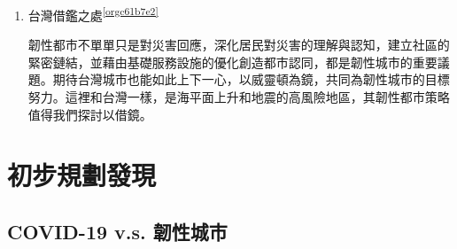 \documentclass[a4paper,12pt]{article}
\begin{document}
\begin{enumerate}
\begin{enumerate}
\item 台灣借鑑之處\textsuperscript{\ref{orgc61b7e2}}
\label{sec:org38142f9}

韌性都市不單單只是對災害回應，深化居民對災害的理解與認知，建立社區的緊密鏈結，並藉由基礎服務設施的優化創造都市認同，都是韌性城市的重要議題。期待台灣城市也能如此上下一心，以威靈頓為鏡，共同為韌性城市的目標努力。這裡和台灣一樣，是海平面上升和地震的高風險地區，其韌性都市策略值得我們探討以借鏡。\\
\newpage
\end{enumerate}
\end{enumerate}

\section{初步規劃發現}
\label{sec:orgf45dd0e}

\subsection{COVID-19 v.s. 韌性城市}
\label{sec:orgf6e96e0}
\end{document}
